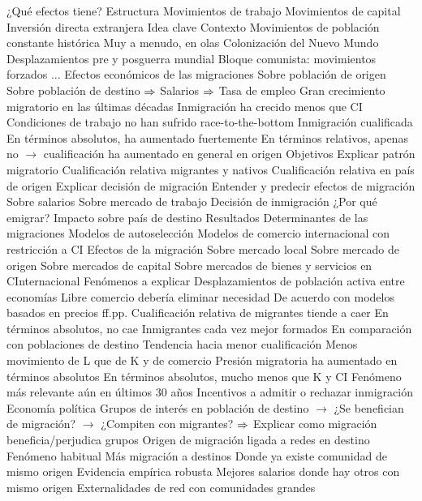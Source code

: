 \documentclass{nuevotema}
\begin{document}
\begin{esquemal}
			\3 ¿Qué efectos tiene?
		\2 Estructura
			\3 Movimientos de trabajo
			\3 Movimientos de capital
				\4 Inversión directa extranjera
	\1 
		\2 Idea clave
			\3 Contexto
				\4 Movimientos de población constante histórica
				\4 Muy a menudo, en olas
				\4[] Colonización del Nuevo Mundo
				\4[] Desplazamientos pre y posguerra mundial
				\4[] Bloque comunista: movimientos forzados
				\4[] ...
				\4 Efectos económicos de las migraciones
				\4[] Sobre población de origen
				\4[] Sobre población de destino
				\4[] $\Rightarrow$ Salarios
				\4[] $\Rightarrow$ Tasa de empleo
				\4 Gran crecimiento migratorio en las últimas décadas
				\4 Inmigración ha crecido menos que CI
				\4 Condiciones de trabajo no han sufrido race-to-the-bottom
				\4 Inmigración cualificada
				\4[] En términos absolutos, ha aumentado fuertemente
				\4[] En términos relativos, apenas no
				\4[] $\to$ cualificación ha aumentado en general en origen
			\3 Objetivos
				\4 Explicar patrón migratorio
				\4[] Cualificación relativa migrantes y nativos
				\4[] Cualificación relativa en país de origen
				\4 Explicar decisión de migración
				\4 Entender y predecir efectos de migración
				\4[] Sobre salarios
				\4[] Sobre mercado de trabajo
				\4 Decisión de inmigración
				\4[] ¿Por qué emigrar?
				\4 Impacto sobre país de destino
			\3 Resultados
				\4 Determinantes de las migraciones
				\4[] Modelos de autoselección
				\4[] Modelos de comercio internacional con restricción a CI
				\4 Efectos de la migración
				\4[] Sobre mercado local
				\4[] Sobre mercado de origen
				\4[] Sobre mercados de capital
				\4[] Sobre mercados de bienes y servicios en CInternacional
		\2 Fenómenos a explicar
			\3 Desplazamientos de población activa entre economías
				\4 Libre comercio debería eliminar necesidad
				\4[] De acuerdo con modelos basados en precios ff.pp.
			\3 Cualificación relativa de migrantes tiende a caer
				\4 En términos absolutos, no cae
				\4[] Inmigrantes cada vez mejor formados
				\4 En comparación con poblaciones de destino
				\4[] Tendencia hacia menor cualificación
			\3 Menos movimiento de L que de K y de comercio
				\4 Presión migratoria ha aumentado en términos absolutos
				\4[] En términos absolutos, mucho menos que K y CI
				\4 Fenómeno más relevante aún en últimos 30 años
			\3 Incentivos a admitir o rechazar inmigración
				\4 Economía política
				\4[] Grupos de interés en población de destino
				\4[] $\to$ ¿Se benefician de migración?
				\4[] $\to$ ¿Compiten con migrantes?
				\4[] $\Rightarrow$ Explicar como migración beneficia/perjudica grupos
			\3 Origen de migración ligada a redes en destino
				\4 Fenómeno habitual
				\4 Más migración a destinos
				\4[] Donde ya existe comunidad de mismo origen
				\4 Evidencia empírica robusta
				\4 Mejores salarios donde hay otros con mismo origen
				\4[] Externalidades de red con comunidades grandes


\end{esquemal}
\end{document}
